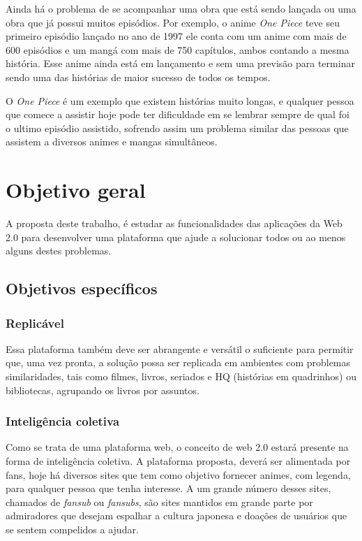 \documentclass[
	12pt,				%
	openright,			%
	twoside,			%
	a4paper,			%
	Times,
	brazil,				%
	]{abntex2}
\begin{document}
Ainda há o problema de se acompanhar uma obra que está sendo lançada ou uma obra que já possui muitos episódios. Por exemplo, o anime  \textit{One Piece} teve seu primeiro episódio lançado no ano de 1997 ele conta com um anime com mais de 600 episódios e um mangá com mais de 750 capítulos, ambos contando a mesma história. Esse anime ainda está em lançamento e sem uma previsão para terminar sendo uma das histórias de maior sucesso de todos os tempos.
\par

O \textit{One Piece} é um exemplo que existem histórias muito longas, e qualquer pessoa que comece a assistir hoje pode ter dificuldade em se lembrar sempre de qual foi o ultimo episódio assistido, sofrendo assim um problema similar das pessoas que assistem a diversos animes e mangas simultâneos.
\par


\section{Objetivo geral}

A proposta deste trabalho, é estudar as funcionalidades das aplicações da Web 2.0 para desenvolver uma plataforma que ajude a solucionar todos ou ao menos alguns destes problemas.
\par

\subsection{Objetivos específicos}
\subsubsection{Replicável}
Essa plataforma também deve ser abrangente e versátil o suficiente para permitir que, uma vez pronta, a solução possa ser replicada em ambientes com problemas similaridades, tais como filmes, livros, seriados e HQ (histórias em quadrinhos) ou bibliotecas, agrupando os livros por assuntos.
\par

\subsubsection{Inteligência coletiva}
Como se trata de uma plataforma web, o conceito de web 2.0 estará presente na forma de inteligência coletiva. A plataforma proposta, deverá ser alimentada por fans, hoje há diversos sites que tem como objetivo fornecer animes, com legenda, para qualquer pessoa que tenha interesse. A um grande número desses sites, chamados de \textit{fansub} ou \textit{fansubs}, são sites mantidos em grande parte por admiradores que desejam espalhar a cultura japonesa e doações de usuários que se sentem compelidos a ajudar.
\par 
\end{document}
